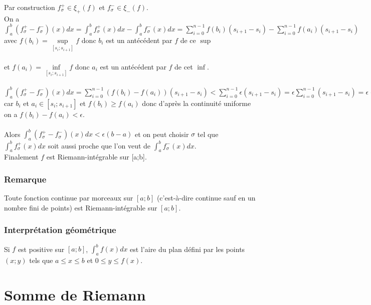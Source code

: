 \documentclass[a4paper,10pt]{book} %
\begin{document}
Par construction $f_{\sigma}^+\in \xi_+(f)$ et $f_{\sigma}^-\in \xi_-(f)$.\\

On a $\displaystyle \int_a^b(f_{\sigma}^+-f_{\sigma}^-)(x)dx=\int_{a}^{b}f_{\sigma}^+(x)dx-\int_a^bf_{\sigma}^-(x)dx
=\sum\limits_{i=0}^{n-1}f(b_i)(s_{i+1}-s_i)-\sum\limits_{i=0}^{n-1}f(a_i)(s_{i+1}-s_i)$\\
avec $f(b_i)=\underset{[s_i;s_{i+1}]}{\sup}f$ donc $b_i$ est un antécédent par $f$ de ce $\sup$ \\\\
et $f(a_i)=\underset{[s_i;s_{i+1}]}{\inf}f$ donc $a_i$ est un antécédent par $f$ de cet $\inf$.\\\\

$\displaystyle\int_a^b (f_{\sigma}^+-f_{\sigma}^-)(x)dx=\sum\limits_{i=0}^{n-1}(f(b_i)-f(a_i))(s_{i+1}-s_i)<\sum\limits_{i=0}^{n-1}\epsilon (s_{i+1}-s_i)=\epsilon \sum\limits_{i=0}^{n-1}(s_{i+1}-s_i)=\epsilon(b-a)$\\

car $b_i$ et $a_i \in [s_i;s_{i+1}]$ et $f(b_i)\geq f(a_i)$ donc d'après la continuité uniforme on a $f(b_i)-f(a_i)<\epsilon$.\\\\

Alors $\displaystyle\int_a^b (f_{\sigma}^+-f_{\sigma}^-)(x)dx<\epsilon(b-a)$ et on peut choisir $\sigma$ tel que $\displaystyle\int_a^bf_{\sigma}^+(x)dx$ soit aussi proche que l'on veut de $\displaystyle\int_a^bf_{\sigma}^-(x)dx$.\\

Finalement $f$ est Riemann-intégrable sur [a;b].

\subsubsection{Remarque}
Toute fonction continue par morceaux sur $[a;b]$ (c'est-à-dire continue sauf en un nombre fini de points) est Riemann-intégrable sur $[a;b]$.

\subsubsection{Interprétation géométrique}
Si $f$ est positive sur $[a;b]$, $\displaystyle\int_a^bf(x)dx$ est l'aire du plan défini par les points $(x;y)$ tels que $a\leq x \leq b$ et $0\leq y \leq f(x)$.

\section{Somme de Riemann}
\end{document}

